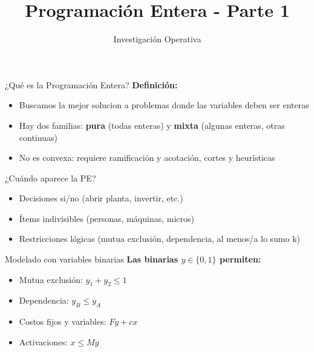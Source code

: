 \documentclass{beamer}
\title{\Huge\textbf{Programación Entera - Parte 1}}
\author{Investigación Operativa}
\date{}
\begin{document}
\begin{frame}
    \titlepage
\end{frame}

\begin{frame}{¿Qué es la Programación Entera?}
    \textbf{Definición:}
    \begin{itemize}
        \item Buscamos la mejor solucion a problemas donde las variables deben ser enteras
        \item Hay dos familias: \textbf{pura} (todas enteras) y \textbf{mixta} (algunas enteras, otras continuas)
        \item No es convexa: requiere ramificación y acotación, cortes y heurísticas
    \end{itemize}
\end{frame}

\begin{frame}{¿Cuándo aparece la PE?}
    \begin{itemize}
        \item Decisiones si/no (abrir planta, invertir, etc.)
        \item Ítems indivisibles (personas, máquinas, micros)
        \item Restricciones lógicas (mutua exclusión, dependencia, al menos/a lo sumo k)
    \end{itemize}
\end{frame}

\begin{frame}{Modelado con variables binarias}
    \textbf{Las binarias $y \in \{0,1\}$ permiten:}
    \begin{itemize}
        \item Mutua exclusión: $y_1 + y_2 \leq 1$
        \item Dependencia: $y_B \leq y_A$
        \item Costos fijos y variables: $F y + c x$
        \item Activaciones: $x \leq M y$
    \end{itemize}
\end{frame}
\end{document}
